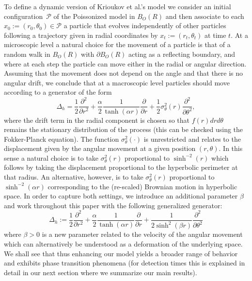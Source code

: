 \medskip
To define a dynamic version of Krioukov et al.'s model we consider an initial configuration~$\mathcal{P}$ of the Poissonized model in $B_O(R)$ and then associate to each $x_0:=(r_0,\theta_0)\in\mathcal{P}$ a particle that evolves independently of other particles following a trajectory given in radial coordinates by $x_t:=(r_t,\theta_t)$ at time $t$. At a microscopic level a natural choice for the movement of a particle is that of a random walk in $B_O(R)$ with $\partial B_O(R)$ acting as a reflecting boundary, and where at each step the particle can move either in the radial or angular direction. Assuming that the movement does not depend on the angle %
and that there is no angular drift, we conclude that at a macroscopic level particles should move according to a generator of the form
\[\Delta_{h} = \frac{1}{2}\frac{\partial^2}{\partial r^2}+\frac{\alpha}{2}\frac{1}{\tanh(\alpha r)}\frac{\partial}{\partial r}+\frac12\sigma^2_\theta(r)\frac{\partial^2}{\partial\theta^2},\]
where the drift term in the radial component is chosen so that $f(r)drd\theta$ remains the stationary distribution of the process (this can be checked using the Fokker-Planck equation). The function $\sigma^2_{\theta}(\cdot)$ is unrestricted and relates to the displacement given by the angular movement at a given position $(r,\theta)$. In this sense a natural choice is to take $\sigma^2_\theta(r)$ proportional to $\sinh^{-2}(r)$ which follows by taking the displacement proportional to the hyperbolic perimeter at that radius. An alternative, however, is to take $\sigma^2_\theta(r)$ proportional to $\sinh^{-2}(\alpha r)$ 
corresponding to the (re-scaled) Brownian motion in hyperbolic space.
In order to capture both settings, we introduce an additional parameter 
$\beta$ and work throughout this paper with the following generalized generator:
\begin{equation}\label{truegenerator}
	\Delta_{h} := \frac{1}{2}\frac{\partial^2}{\partial r^2}+\frac{\alpha}{2}\frac{1}{\tanh(\alpha r)}\frac{\partial}{\partial r}+\frac{1}{2\sinh^2(\beta r)}\frac{\partial^2}{\partial\theta^2}
	\end{equation}
where $\beta>0$ is a new parameter related to the velocity of the angular movement which can alternatively be understood as a deformation of the underlying space.
We shall see that thus enhancing our model yields a broader range of behavior and exhibits phase transition phenomena  
(for detection times this is explained in detail in our next section where we summarize our main results).



